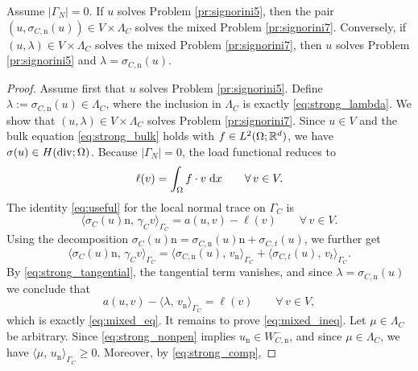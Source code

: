 \begin{proposition}
	Assume $|\Gamma_N|=0$.
	If $u$ solves Problem \ref{pr:signorini5}, then the pair $(u,\sigma_{C, \mathrm n}(u))\in V\times \Lambda_C$ solves the mixed Problem \ref{pr:signorini7}. Conversely, if $(u,\lambda)\in V\times \Lambda_C$ solves the mixed Problem \ref{pr:signorini7}, then $u$ solves Problem \ref{pr:signorini5} and $\lambda=\sigma_{C, \mathrm n}(u)$.
\end{proposition}
\begin{proof}
	Assume first that $u$ solves Problem \ref{pr:signorini5}. Define $\lambda:=\sigma_{C, \mathrm n}(u)\in \Lambda_C$, where the inclusion in $\Lambda_C$ is exactly \eqref{eq:strong_lambda}. We show that $(u,\lambda)\in V\times \Lambda_C$ solves Problem \ref{pr:signorini7}. Since $u\in V$ and the bulk equation \eqref{eq:strong_bulk} holds with $f\in L^2(\Omega;{\mathbb R}^d)$, we have $\sigma(u)\in H(\diver;\Omega)$. Because $|\Gamma_N|=0$, the load functional reduces to
	\begin{equation*}
		\ell(v)=\int_\Omega f\cdot v\;{{\mathrm{d}} x}
		\qquad\forall\,v\in V.
	\end{equation*}
	The identity \eqref{eq:useful} for the local normal trace on $\Gamma_C$ is
    \begin{equation}\label{eq:usefullocal}
        \langle \sigma_C(u)\mathrm n,\,\gamma_C v\rangle_{\Gamma_C} = a(u,v)-\ell(v)\qquad\forall\,v\in V.
    \end{equation}
    Using the decomposition $\sigma_C(u)\mathrm{n} = \sigma_{C, \mathrm n}(u)\mathrm{n}+\sigma_{C,t}(u)$, we further get
	\begin{equation*}
		\langle \sigma_C(u)\mathrm n,\,\gamma_C v\rangle_{\Gamma_C}
		=
		\langle \sigma_{C, \mathrm n}(u),\,v_{\mathrm n}\rangle_{\Gamma_C}
		+
		\langle \sigma_{C,t}(u),\,v_t\rangle_{\Gamma_C}.
	\end{equation*}
	By \eqref{eq:strong_tangential}, the tangential term vanishes, and since $\lambda=\sigma_{C, \mathrm n}(u)$
	we conclude that
	\begin{equation*}
		a(u,v)-\langle \lambda,\,v_{\mathrm n}\rangle_{\Gamma_C}
		=
		\ell(v)
		\qquad\forall\,v\in V,
	\end{equation*}
	which is exactly \eqref{eq:mixed_eq}. It remains to prove \eqref{eq:mixed_ineq}. Let $\mu\in \Lambda_C$ be arbitrary. Since \eqref{eq:strong_nonpen} implies $u_{\mathrm n}\in W_{C,\mathrm n}^-$, and since $\mu\in \Lambda_C$, we have $\langle \mu,\,u_{\mathrm n}\rangle_{\Gamma_C}\ge 0$. Moreover, by \eqref{eq:strong_comp},

\end{proof}

